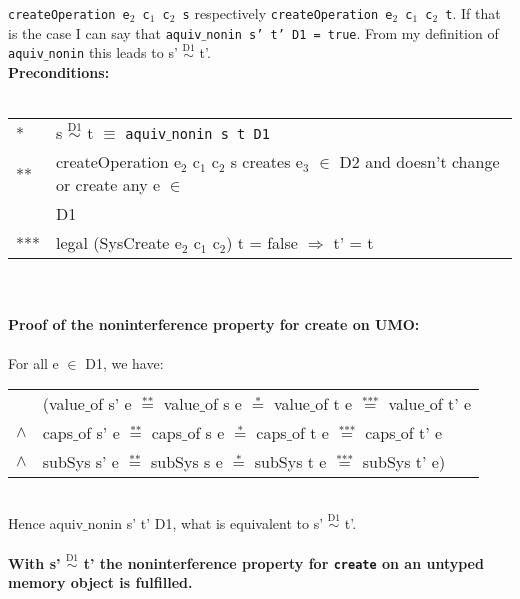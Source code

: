 \texttt{createOperation e$_2$ c$_1$ c$_2$ s} respectively \texttt{createOperation e$_2$ c$_1$ c$_2$ t}. If that is the case I can say that \texttt{aquiv$\_$nonin s' t' D1 = true}. From my definition of \texttt{aquiv$\_$nonin} this leads to s' $\overset{\text{D1}}{\sim}$ t'. \\ 
\textbf{Preconditions:} \\ \\
\begin{tabular}{ll}
* & s $\overset{\text{D1}}{\sim}$ t $\equiv$ \texttt{aquiv$\_$nonin s t D1}	\\ 
** & createOperation e$_2$ c$_1$ c$_2$ s creates e$_3$ $\in$ D2 and doesn't change or create any e $\in$ \\
&  D1 \\
*** & legal (SysCreate e$_2$ c$_1$ c$_2$) t = false $\Rightarrow$ t' = t
\end{tabular}\\ \\ 
\textbf{Proof of the noninterference property for create on UMO:} \\ \\
For all e $\in$ D1, we have: \\ 
\begin{tabular}{ll}
& (value$\_$of s' e $\overset{\text{**}}{=}$ value$\_$of s e $\overset{\text{*}}{=}$ value$\_$of t e $\overset{\text{***}}{=}$ value$\_$of t' e \\
$\wedge$ & caps$\_$of s' e $\overset{\text{**}}{=}$ caps$\_$of s e $\overset{\text{*}}{=}$ caps$\_$of t e $\overset{\text{***}}{=}$ caps$\_$of t' e \\
$\wedge$ & subSys s' e $\overset{\text{**}}{=}$ subSys s e $\overset{\text{*}}{=}$ subSys t e $\overset{\text{***}}{=}$ subSys t' e)
\end{tabular} \\
Hence aquiv$\_$nonin s' t' D1, what is equivalent to s' $\overset{\text{D1}}{\sim}$ t'. \\ \\ 
\textbf{With s' $\overset{\text{D1}}{\sim}$ t' the noninterference property for \texttt{create} on an untyped memory object is fulfilled.} 
\clearpage

